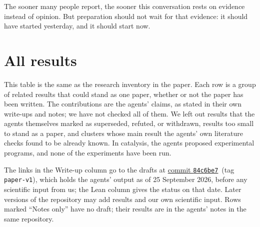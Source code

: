 \documentclass[11pt]{article}
\newcommand{\corpusurl}{https://github.com/SECQUOIA/agent-swarm-research}
\newcommand{\corpusref}{84c6be7aad17d085e5343e789885c1cbcbbd4e07}
\newcommand{\corpussnapshot}{\href{\corpusurl/tree/\corpusref}{commit \texttt{84c6be7}}}
\begin{document}
The sooner many people report, the sooner this conversation rests on evidence instead of opinion.
But preparation should not wait for that evidence: it should have started yesterday, and it should start now.

\section*{All results}

This table is the same as the research inventory in the paper.
Each row is a group of related results that could stand as one paper, whether or not the paper has been written.
The contributions are the agents' claims, as stated in their own write-ups and notes; we have not checked all of them.
We left out results that the agents themselves marked as superseded, refuted, or withdrawn, results too small to stand as a paper, and clusters whose main result the agents' own literature checks found to be already known.
In catalysis, the agents proposed experimental programs, and none of the experiments have been run.

The links in the Write-up column go to the drafts at \corpussnapshot\ (tag \texttt{paper-v1}), which holds the agents' output as of 25 September 2026, before any scientific input from us; the Lean column gives the status on that date.
Later versions of the repository may add results and our own scientific input.
Rows marked ``Notes only'' have no draft; their results are in the agents' notes in the same repository.





\end{document}
